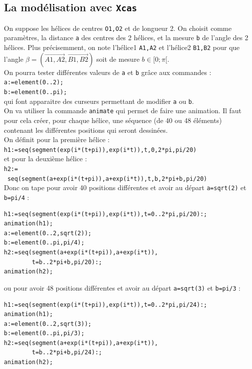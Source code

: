 \documentclass[a4paper,11pt]{book}
\begin{document}
\subsection{La mod\'elisation avec {\tt Xcas}}
On suppose les h\'elices de centres {\tt O1,O2} et de longueur 2.
On choisit comme param\`etres, la 
distance {\tt a} des centres des 2 h\'elices, et la mesure {\tt b} de l'angle 
des 2 h\'elices. Plus pr\'ecisemment, on note 
l'h\'elice1 {\tt A1,A2} et l'h\'elice2 {\tt B1,B2} pour que l'angle
$\beta=(\overrightarrow{A1,A2},\overrightarrow{B1,B2})$ soit de mesure 
$b\in [0;\pi[$.\\
On pourra tester diff\'erentes valeurs de {\tt a} et {\tt b} gr\^ace aux 
commandes :\\
{\tt a:=element(0..2);}\\
{\tt b:=element(0..pi);}\\
qui font apparaitre des curseurs permettant de modifier {\tt a} ou {\tt b}.\\
On va utiliser la commande {\tt animate} qui permet de faire une animation.
Il faut pour cela cr\'eer, pour chaque h\'elice, une s\'equence (de 40 ou 48 
\'el\'ements) contenant les diff\'erentes positions qui seront dessin\'ees.\\
On d\'efinit pour la premi\`ere h\'elice :\\
{\tt h1:=seq(segment(exp(i*(t+pi)),exp(i*t)),t,0,2*pi,pi/20)}\\
et pour la deuxi\`eme h\'elice :\\
{\tt h2:=}\\
{\tt \hspace{2cm} seq(segment(a+exp(i*(t+pi)),a+exp(i*t)),t,b,2*pi+b,pi/20)}\\
Donc on tape pour avoir 40 positions diff\'erentes et avoir au d\'epart 
{\tt a=sqrt(2)} et {\tt b=pi/4} :
\begin{verbatim}
h1:=seq(segment(exp(i*(t+pi)),exp(i*t)),t=0..2*pi,pi/20):;
animation(h1);
a:=element(0..2,sqrt(2));
b:=element(0..pi,pi/4);
h2:=seq(segment(a+exp(i*(t+pi)),a+exp(i*t)),
        t=b..2*pi+b,pi/20):;
animation(h2);
\end{verbatim}
ou pour avoir 48 positions diff\'erentes et avoir au d\'epart {\tt a=sqrt(3)} 
et {\tt b=pi/3} :
\begin{verbatim}
h1:=seq(segment(exp(i*(t+pi)),exp(i*t)),t=0..2*pi,pi/24):;
animation(h1);
a:=element(0..2,sqrt(3));
b:=element(0..pi,pi/3);
h2:=seq(segment(a+exp(i*(t+pi)),a+exp(i*t)),
        t=b..2*pi+b,pi/24):;
animation(h2);
\end{verbatim}
\end{document}
